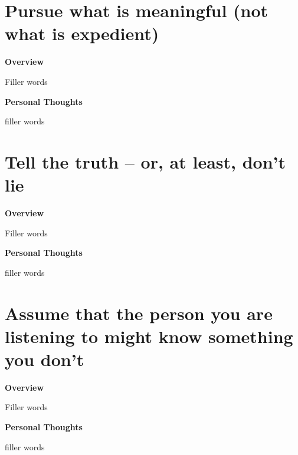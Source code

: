 \documentclass{article}
\begin{document}
\section{Pursue what is meaningful (not what is expedient)}
        \begin{multicols}{2}
        \begin{center}
            \textbf{Overview}
        \end{center}
        
        Filler words 

        \begin{center}
            \textbf{Personal Thoughts}
        \end{center}
        
        filler words
    \end{multicols}
    
\section{Tell the truth – or, at least, don't lie}
        \begin{multicols}{2}
        \begin{center}
            \textbf{Overview}
        \end{center}
        
        Filler words 

        \begin{center}
            \textbf{Personal Thoughts}
        \end{center}
        
        filler words
    \end{multicols}
    
\section{Assume that the person you are listening to might know something you don't}
        \begin{multicols}{2}
        \begin{center}
            \textbf{Overview}
        \end{center}
        
        Filler words 

        \begin{center}
            \textbf{Personal Thoughts}
        \end{center}
        
        filler words
    \end{multicols}
\end{document}
